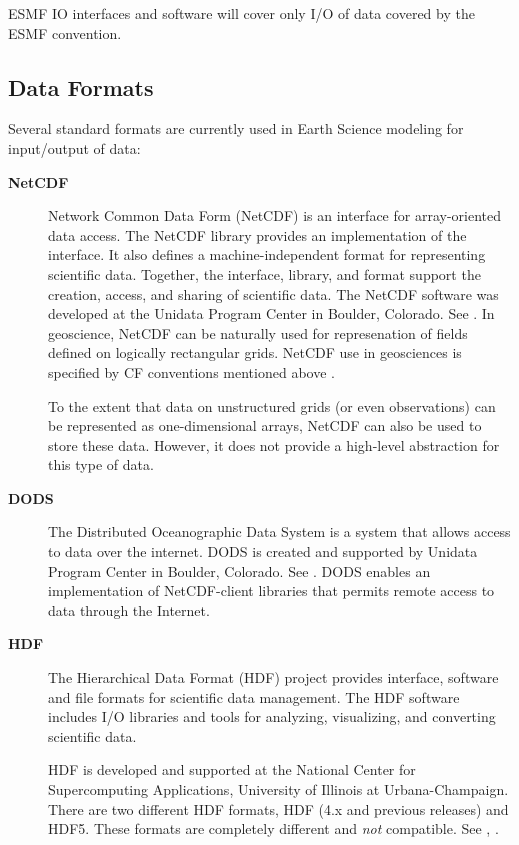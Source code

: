 ESMF I\/O interfaces and software will cover only I/O of data covered by
the ESMF convention.




\subsection{Data Formats}



Several standard formats are currently used in Earth Science modeling
for input/output of data:

\begin{description}
\item[\bf NetCDF] Network Common Data Form (NetCDF) is an interface for 
array-oriented data access. The NetCDF library provides an
implementation of the interface. It also defines a 
machine-independent format for representing scientific data. Together,
the interface, library, and format support the creation, access, and
sharing of scientific data. The NetCDF software was developed at the
Unidata Program Center in Boulder, Colorado. See \cite{NetCDF3_UsersGuide_C}.
In geoscience, NetCDF can be naturally used for represenation of fields 
defined on logically rectangular grids. NetCDF use in geosciences is 
specified by CF conventions mentioned above \cite{NetCDF_CF_v1_beta3}. 

To the extent that data on unstructured grids (or even observations) can be 
represented as one-dimensional arrays, NetCDF can also be used to store these 
data. However, it does not provide a high-level abstraction for this type of 
data. 

\item[\bf DODS] The Distributed Oceanographic Data System is a system that 
allows access to data over the internet. DODS is created and supported by 
Unidata Program Center in Boulder, Colorado. See \cite{DODS}. DODS enables an 
implementation of NetCDF-client libraries that permits remote access to data 
through the Internet.


\item[\bf HDF] The Hierarchical Data Format (HDF) project provides
interface,  software and file formats for scientific data management. 
The HDF software includes I/O libraries and tools for analyzing,
visualizing, and converting scientific data. 

HDF is developed and supported at the National Center for Supercomputing 
Applications, University of Illinois at Urbana-Champaign. There are two 
different HDF formats, HDF (4.x and previous releases) and HDF5. These 
formats are completely different and {\it not} compatible.  See
\cite{HDF4_tutorials}, \cite{HDF5_tutorial}.


\end{description}
